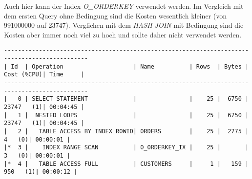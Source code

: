 \documentclass[11pt,a4paper,parskip=half]{scrartcl}
\begin{document}
Auch hier kann der Index \emph{O\_ORDERKEY} verwendet werden. Im Vergleich mit dem ersten Query ohne Bedingung sind die Kosten wesentlich kleiner (von 991000000 auf 23747). Verglichen mit dem \emph{HASH JOIN} mit Bedingung sind die Kosten aber immer noch viel zu hoch und sollte daher nicht verwendet werden.
\begin{lstlisting}
----------------------------------------------------------------------------------------------                                                                                                                                                                                                               
| Id  | Operation                    | Name          | Rows  | Bytes | Cost (%CPU)| Time     |                                                                                                                                                                                                               
----------------------------------------------------------------------------------------------                                                                                                                                                                                                               
|   0 | SELECT STATEMENT             |               |    25 |  6750 | 23747   (1)| 00:04:45 |                                                                                                                                                                                                               
|   1 |  NESTED LOOPS                |               |    25 |  6750 | 23747   (1)| 00:04:45 |                                                                                                                                                                                                               
|   2 |   TABLE ACCESS BY INDEX ROWID| ORDERS        |    25 |  2775 |     4   (0)| 00:00:01 |                                                                                                                                                                                                               
|*  3 |    INDEX RANGE SCAN          | O_ORDERKEY_IX |    25 |       |     3   (0)| 00:00:01 |                                                                                                                                                                                                               
|*  4 |   TABLE ACCESS FULL          | CUSTOMERS     |     1 |   159 |   950   (1)| 00:00:12 |                                                                                                                                                                                                               

\end{lstlisting}
\end{document}
